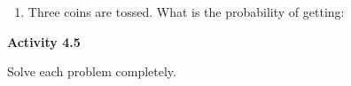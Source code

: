 \begin{enumerate}
\item Three coins are tossed. What is the probability of getting:
\begin{enumerate}
\end{enumerate} 

\end{enumerate}  

 \vspace{0.3ex}
\noindent\textbf{Activity 4.5}

\vspace{0.2ex}

Solve each problem completely.

